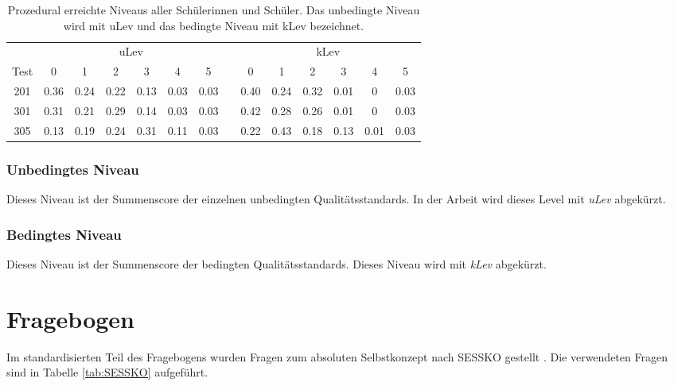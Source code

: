 \begin{table}[htbp]
  \centering
\begin{tabular}{cccccccccccccc}
\toprule
 &  \multicolumn{6}{c}{uLev} &&  \multicolumn{6}{c}{kLev}\\ 
 Test & 0 & 1 & 2 & 3 & 4 & 5 && 0 & 1 & 2 & 3 & 4 & 5\\ 
\midrule
 201 &   0.36 & 0.24 & 0.22 & 0.13 & 0.03 & 0.03 && 0.40 & 0.24 & 0.32  & 0.01 & 0 & 0.03   \\ 
 301 &   0.31 & 0.21 & 0.29 & 0.14 & 0.03 & 0.03  && 0.42 & 0.28 & 0.26 & 0.01 & 0 & 0.03  \\ 
 305 &   0.13 & 0.19 & 0.24 & 0.31 & 0.11 & 0.03  && 0.22 & 0.43 & 0.18 & 0.13 & 0.01 & 0.03 \\ 
\bottomrule
\end{tabular} 
  \caption{Prozedural erreichte Niveaus aller Schülerinnen und Schüler. Das unbedingte Niveau wird mit uLev und das bedingte Niveau mit kLev bezeichnet. }
  \label{tab:Niveau}
\end{table}

\subsubsection{Unbedingtes Niveau}
Dieses Niveau ist der Summenscore der einzelnen unbedingten Qualitätsstandards. In der Arbeit wird dieses Level mit \textit{uLev} abgekürzt.

\subsubsection{Bedingtes Niveau}

Dieses Niveau ist der Summenscore der bedingten Qualitätsstandards. Dieses Niveau wird mit \textit{kLev} abgekürzt.




\section{Fragebogen}

Im standardisierten Teil des Fragebogens wurden Fragen zum absoluten Selbstkonzept nach SESSKO gestellt \citep{Schone2002}. Die verwendeten Fragen sind in Tabelle \ref{tab:SESSKO} aufgeführt. 



